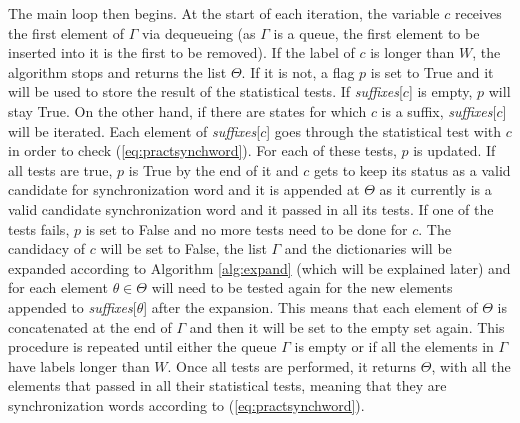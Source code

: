 {The main loop then begins. At the start of each iteration, the variable $c$ receives the first element of $\Gamma$ via dequeueing (as $\Gamma$ is a queue, the first element to be inserted into it is the first to be removed). If the label of $c$ is longer than $W$, the algorithm stops and returns the list $\Theta$. If it is not, a flag $p$ is set to True and it will be used to store the result of the statistical tests. If \textit{suffixes}[$c$] is empty, $p$ will stay True. On the other hand, if there are states for which $c$ is a suffix, \textit{suffixes}[$c$] will be iterated. Each element of \textit{suffixes}[$c$] goes through the statistical test with $c$ in order to check (\ref{eq:practsynchword}). For each of these tests, $p$ is updated. If all tests are true, $p$ is True by the end of it and $c$ gets to keep its status as a valid candidate for synchronization word and it is appended at $\Theta$ as it currently is a valid candidate synchronization word and it passed in all its tests. If one of the tests fails, $p$ is set to False and no more tests need to be done for $c$. The candidacy of $c$ will be set to False, the list $\Gamma$ and the dictionaries will be expanded according to Algorithm \ref{alg:expand} (which will be explained later) and for each element $\theta \in \Theta$ will need to be tested again for the new elements appended to \textit{suffixes}[$\theta$] after the expansion. This means that each element of $\Theta$ is concatenated at the end of $\Gamma$ and then it will be set to the empty set again. This procedure is repeated until either the queue $\Gamma$ is empty or if all the elements in $\Gamma$ have labels longer than $W$. Once all tests are performed, it returns $\Theta$, with all the elements that passed in all their statistical tests, meaning that they are synchronization words according to (\ref{eq:practsynchword}). 

}
